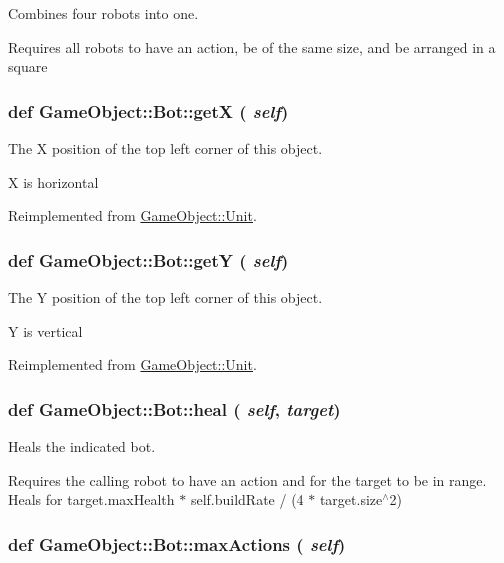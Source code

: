 Combines four robots into one. 

Requires all robots to have an action, be of the same size, and be arranged in a square \hypertarget{classGameObject_1_1Bot_a76521d97d7dcce093efbdd1926c75750}{
\subsubsection[{getX}]{\setlength{\rightskip}{0pt plus 5cm}def GameObject::Bot::getX ( {\em self})}}
\label{classGameObject_1_1Bot_a76521d97d7dcce093efbdd1926c75750}


The X position of the top left corner of this object. 

X is horizontal 

Reimplemented from \hyperlink{classGameObject_1_1Unit_a01711efd87c7e3e2a97066e9a5c50da5}{GameObject::Unit}.

\hypertarget{classGameObject_1_1Bot_a5e193704cae24529a6e6f00fd9a1447f}{
\subsubsection[{getY}]{\setlength{\rightskip}{0pt plus 5cm}def GameObject::Bot::getY ( {\em self})}}
\label{classGameObject_1_1Bot_a5e193704cae24529a6e6f00fd9a1447f}


The Y position of the top left corner of this object. 

Y is vertical 

Reimplemented from \hyperlink{classGameObject_1_1Unit_a4d0c47deb0ddb19b9e2b195d8ca2f2ad}{GameObject::Unit}.

\hypertarget{classGameObject_1_1Bot_ab0d8899c1214ba9b4311300dc0e7cb1b}{
\subsubsection[{heal}]{\setlength{\rightskip}{0pt plus 5cm}def GameObject::Bot::heal ( {\em self}, \/   {\em target})}}
\label{classGameObject_1_1Bot_ab0d8899c1214ba9b4311300dc0e7cb1b}


Heals the indicated bot. 

Requires the calling robot to have an action and for the target to be in range. Heals for target.maxHealth $\ast$ self.buildRate / (4 $\ast$ target.size$^\wedge$2) \hypertarget{classGameObject_1_1Bot_ac926e9da58f96ee5996d22e609d1a41e}{
\subsubsection[{maxActions}]{\setlength{\rightskip}{0pt plus 5cm}def GameObject::Bot::maxActions ( {\em self})}}
\label{classGameObject_1_1Bot_ac926e9da58f96ee5996d22e609d1a41e}


